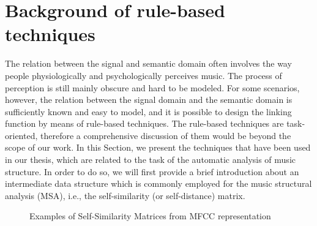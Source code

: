\section{Background of rule-based techniques}\label{sec:ML:rule-based}
The relation between the signal and semantic domain often involves the way people physiologically and psychologically perceives music. The process of perception is still mainly obscure and hard to be modeled. For some scenarios, however, the relation between the signal domain and the semantic domain is sufficiently known and easy to model, and it is possible to design the linking function by means of rule-based techniques. The rule-based techniques are task-oriented, therefore a comprehensive discussion of them would be beyond the scope of our work. In this Section, we present the techniques that have been used in our thesis, which are related to the task of the automatic analysis of music structure. In order to do so, we will first provide a brief introduction about an intermediate data structure which is commonly employed for the music structural analysis (MSA), i.e., the self-similarity (or self-distance) matrix.

\begin{figure}[tb]
        \centering
       \hfil
        \caption{Examples of Self-Similarity Matrices from MFCC representation}
        \label{fig:ML:SSMs_mfcc}         
\end{figure}

